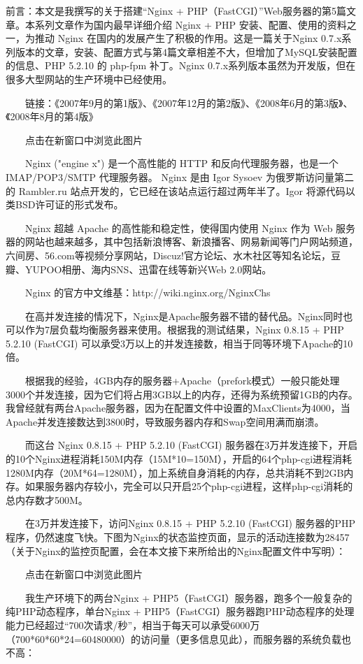 前言：本文是我撰写的关于搭建“Nginx + PHP（FastCGI）”Web服务器的第5篇文章。本系列文章作为国内最早详细介绍 Nginx + PHP 安装、配置、使用的资料之一，为推动 Nginx 在国内的发展产生了积极的作用。这是一篇关于Nginx 0.7.x系列版本的文章，安装、配置方式与第4篇文章相差不大，但增加了MySQL安装配置的信息、PHP 5.2.10 的 php-fpm 补丁。Nginx 0.7.x系列版本虽然为开发版，但在很多大型网站的生产环境中已经使用。

　　链接：《2007年9月的第1版》、《2007年12月的第2版》、《2008年6月的第3版》、《2008年8月的第4版》

　　点击在新窗口中浏览此图片

　　Nginx ("engine x") 是一个高性能的 HTTP 和反向代理服务器，也是一个 IMAP/POP3/SMTP 代理服务器。 Nginx 是由 Igor Sysoev 为俄罗斯访问量第二的 Rambler.ru 站点开发的，它已经在该站点运行超过两年半了。Igor 将源代码以类BSD许可证的形式发布。

　　Nginx 超越 Apache 的高性能和稳定性，使得国内使用 Nginx 作为 Web 服务器的网站也越来越多，其中包括新浪博客、新浪播客、网易新闻等门户网站频道，六间房、56.com等视频分享网站，Discuz!官方论坛、水木社区等知名论坛，豆瓣、YUPOO相册、海内SNS、迅雷在线等新兴Web 2.0网站。


　　Nginx 的官方中文维基：http://wiki.nginx.org/NginxChs


　　在高并发连接的情况下，Nginx是Apache服务器不错的替代品。Nginx同时也可以作为7层负载均衡服务器来使用。根据我的测试结果，Nginx 0.8.15 + PHP 5.2.10 (FastCGI) 可以承受3万以上的并发连接数，相当于同等环境下Apache的10倍。

　　根据我的经验，4GB内存的服务器+Apache（prefork模式）一般只能处理3000个并发连接，因为它们将占用3GB以上的内存，还得为系统预留1GB的内存。我曾经就有两台Apache服务器，因为在配置文件中设置的MaxClients为4000，当Apache并发连接数达到3800时，导致服务器内存和Swap空间用满而崩溃。

　　而这台 Nginx 0.8.15 + PHP 5.2.10 (FastCGI) 服务器在3万并发连接下，开启的10个Nginx进程消耗150M内存（15M*10=150M），开启的64个php-cgi进程消耗1280M内存（20M*64=1280M），加上系统自身消耗的内存，总共消耗不到2GB内存。如果服务器内存较小，完全可以只开启25个php-cgi进程，这样php-cgi消耗的总内存数才500M。

　　在3万并发连接下，访问Nginx 0.8.15 + PHP 5.2.10 (FastCGI) 服务器的PHP程序，仍然速度飞快。下图为Nginx的状态监控页面，显示的活动连接数为28457（关于Nginx的监控页配置，会在本文接下来所给出的Nginx配置文件中写明）：

　　点击在新窗口中浏览此图片

　　我生产环境下的两台Nginx + PHP5（FastCGI）服务器，跑多个一般复杂的纯PHP动态程序，单台Nginx + PHP5（FastCGI）服务器跑PHP动态程序的处理能力已经超过“700次请求/秒”，相当于每天可以承受6000万（700*60*60*24=60480000）的访问量（更多信息见此），而服务器的系统负载也不高：

